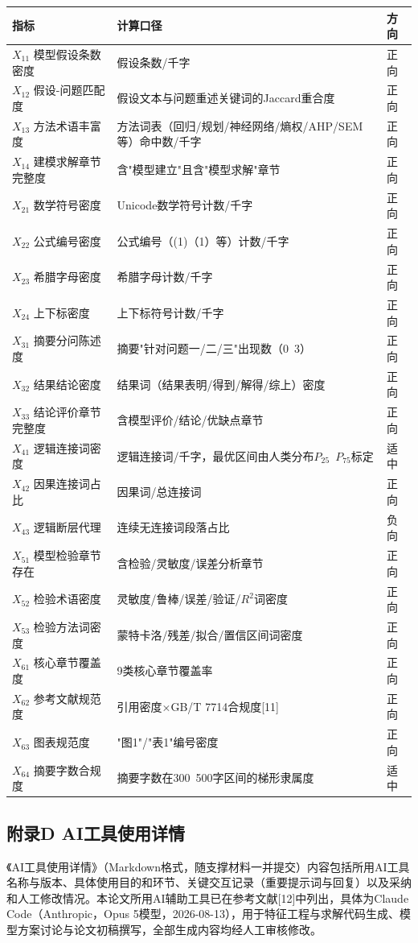 \documentclass[withoutpreface]{cumcmthesis}
\begin{document}
\begin{table}[htbp]
\centering
\small
\begin{tabularx}{\textwidth}{XXX}
\toprule
指标 & 计算口径 & 方向 \\
\midrule
$X_{11}$ 模型假设条数密度 & 假设条数/千字 & 正向 \\
$X_{12}$ 假设-问题匹配度 & 假设文本与问题重述关键词的Jaccard重合度 & 正向 \\
$X_{13}$ 方法术语丰富度 & 方法词表（回归/规划/神经网络/熵权/AHP/SEM等）命中数/千字 & 正向 \\
$X_{14}$ 建模求解章节完整度 & 含"模型建立"且含"模型求解"章节 & 正向 \\
$X_{21}$ 数学符号密度 & Unicode数学符号计数/千字 & 正向 \\
$X_{22}$ 公式编号密度 & 公式编号（(1)（1）等）计数/千字 & 正向 \\
$X_{23}$ 希腊字母密度 & 希腊字母计数/千字 & 正向 \\
$X_{24}$ 上下标密度 & 上下标符号计数/千字 & 正向 \\
$X_{31}$ 摘要分问陈述度 & 摘要"针对问题一/二/三"出现数（0~3） & 正向 \\
$X_{32}$ 结果结论密度 & 结果词（结果表明/得到/解得/综上）密度 & 正向 \\
$X_{33}$ 结论评价章节完整度 & 含模型评价/结论/优缺点章节 & 正向 \\
$X_{41}$ 逻辑连接词密度 & 逻辑连接词/千字，最优区间由人类分布$P_{25}$~$P_{75}$标定 & 适中 \\
$X_{42}$ 因果连接词占比 & 因果词/总连接词 & 正向 \\
$X_{43}$ 逻辑断层代理 & 连续无连接词段落占比 & 负向 \\
$X_{51}$ 模型检验章节存在 & 含检验/灵敏度/误差分析章节 & 正向 \\
$X_{52}$ 检验术语密度 & 灵敏度/鲁棒/误差/验证/$R^2$词密度 & 正向 \\
$X_{53}$ 检验方法词密度 & 蒙特卡洛/残差/拟合/置信区间词密度 & 正向 \\
$X_{61}$ 核心章节覆盖度 & 9类核心章节覆盖率 & 正向 \\
$X_{62}$ 参考文献规范度 & 引用密度×GB/T 7714合规度[11] & 正向 \\
$X_{63}$ 图表规范度 & "图1"/"表1"编号密度 & 正向 \\
$X_{64}$ 摘要字数合规度 & 摘要字数在300~500字区间的梯形隶属度 & 适中 \\
\bottomrule
\end{tabularx}
\end{table}
\subsection{附录D AI工具使用详情}
《AI工具使用详情》（Markdown格式，随支撑材料一并提交）内容包括所用AI工具名称与版本、具体使用目的和环节、关键交互记录（重要提示词与回复）以及采纳和人工修改情况。本论文所用AI辅助工具已在参考文献[12]中列出，具体为Claude Code（Anthropic，Opus 5模型，2026-08-13），用于特征工程与求解代码生成、模型方案讨论与论文初稿撰写，全部生成内容均经人工审核修改。
\end{document}
